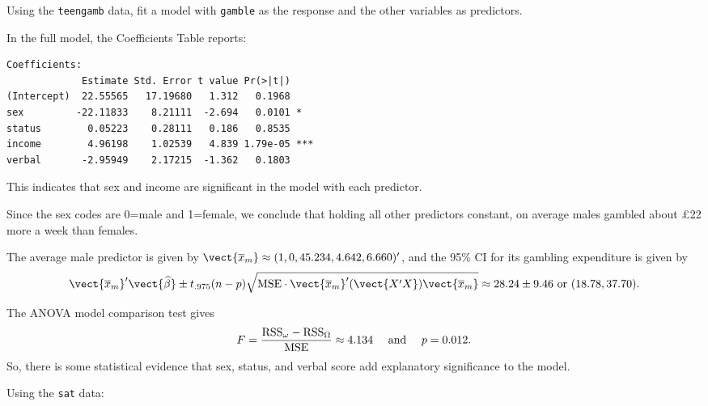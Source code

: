 \documentclass{homework}
\begin{document}
Using the \texttt{teengamb} data, fit a model with \texttt{gamble} as the response and the other variables as predictors.  


In the full model, the Coefficients Table reports:
{\small\begin{verbatim}
Coefficients:
             Estimate Std. Error t value Pr(>|t|)    
(Intercept)  22.55565   17.19680   1.312   0.1968    
sex         -22.11833    8.21111  -2.694   0.0101 *  
status        0.05223    0.28111   0.186   0.8535    
income        4.96198    1.02539   4.839 1.79e-05 ***
verbal       -2.95949    2.17215  -1.362   0.1803    
\end{verbatim}}
This indicates that sex and income are significant in the model with each predictor.


Since the sex codes are 0=male and 1=female, we conclude that holding all other predictors constant, on average males gambled about \pounds22 more a week than females.


The average male predictor is given by $\vect{\bar x_{m}} \approx ( 1,0, 45.234 , 4.642 , 6.660 )'$, and the 95\% CI for its gambling expenditure is given by
$$
 \vect{\bar x_{m}}'\vect{\hat \beta} \pm t_{.975}(n-p)\sqrt{\MSE\cdot\vect {\bar x_m}'(\vect{X'X})\vect {\bar x_m}}\approx 28.24\pm9.46\text{ or }(18.78,37.70).
$$


The ANOVA model comparison test gives
$$
  F = \frac{\mathrm{RSS}_\omega - \mathrm{RSS}_\Omega}{\mathrm{MSE}} \approx 4.134\quad\text{ and }\quad p = 0.012.
$$
So, there is some statistical evidence that sex, status, and verbal score add explanatory significance to the model.

Using the \texttt{sat} data:

\end{document}
